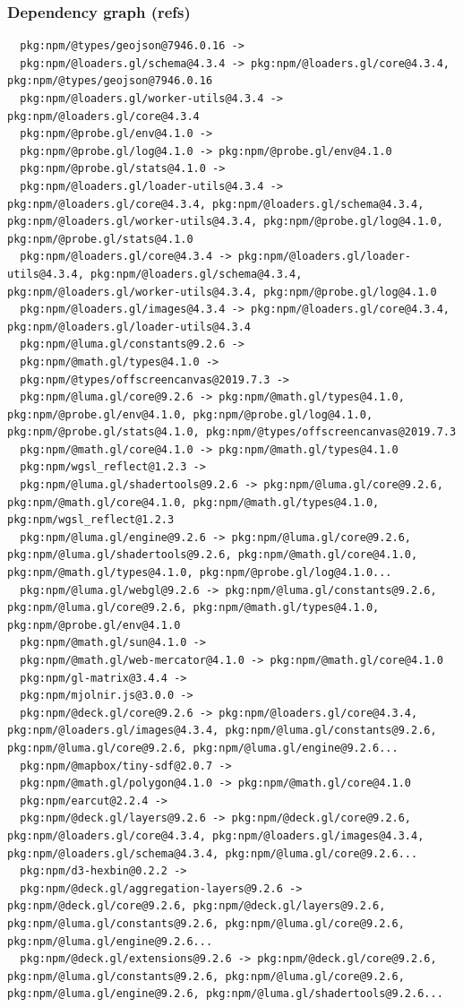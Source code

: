 \documentclass[11pt]{article}
\begin{document}
\subsubsection*{Dependency graph (refs)}
\begin{verbatim}
  pkg:npm/@types/geojson@7946.0.16 -> 
  pkg:npm/@loaders.gl/schema@4.3.4 -> pkg:npm/@loaders.gl/core@4.3.4, pkg:npm/@types/geojson@7946.0.16
  pkg:npm/@loaders.gl/worker-utils@4.3.4 -> pkg:npm/@loaders.gl/core@4.3.4
  pkg:npm/@probe.gl/env@4.1.0 -> 
  pkg:npm/@probe.gl/log@4.1.0 -> pkg:npm/@probe.gl/env@4.1.0
  pkg:npm/@probe.gl/stats@4.1.0 -> 
  pkg:npm/@loaders.gl/loader-utils@4.3.4 -> pkg:npm/@loaders.gl/core@4.3.4, pkg:npm/@loaders.gl/schema@4.3.4, pkg:npm/@loaders.gl/worker-utils@4.3.4, pkg:npm/@probe.gl/log@4.1.0, pkg:npm/@probe.gl/stats@4.1.0
  pkg:npm/@loaders.gl/core@4.3.4 -> pkg:npm/@loaders.gl/loader-utils@4.3.4, pkg:npm/@loaders.gl/schema@4.3.4, pkg:npm/@loaders.gl/worker-utils@4.3.4, pkg:npm/@probe.gl/log@4.1.0
  pkg:npm/@loaders.gl/images@4.3.4 -> pkg:npm/@loaders.gl/core@4.3.4, pkg:npm/@loaders.gl/loader-utils@4.3.4
  pkg:npm/@luma.gl/constants@9.2.6 -> 
  pkg:npm/@math.gl/types@4.1.0 -> 
  pkg:npm/@types/offscreencanvas@2019.7.3 -> 
  pkg:npm/@luma.gl/core@9.2.6 -> pkg:npm/@math.gl/types@4.1.0, pkg:npm/@probe.gl/env@4.1.0, pkg:npm/@probe.gl/log@4.1.0, pkg:npm/@probe.gl/stats@4.1.0, pkg:npm/@types/offscreencanvas@2019.7.3
  pkg:npm/@math.gl/core@4.1.0 -> pkg:npm/@math.gl/types@4.1.0
  pkg:npm/wgsl_reflect@1.2.3 -> 
  pkg:npm/@luma.gl/shadertools@9.2.6 -> pkg:npm/@luma.gl/core@9.2.6, pkg:npm/@math.gl/core@4.1.0, pkg:npm/@math.gl/types@4.1.0, pkg:npm/wgsl_reflect@1.2.3
  pkg:npm/@luma.gl/engine@9.2.6 -> pkg:npm/@luma.gl/core@9.2.6, pkg:npm/@luma.gl/shadertools@9.2.6, pkg:npm/@math.gl/core@4.1.0, pkg:npm/@math.gl/types@4.1.0, pkg:npm/@probe.gl/log@4.1.0...
  pkg:npm/@luma.gl/webgl@9.2.6 -> pkg:npm/@luma.gl/constants@9.2.6, pkg:npm/@luma.gl/core@9.2.6, pkg:npm/@math.gl/types@4.1.0, pkg:npm/@probe.gl/env@4.1.0
  pkg:npm/@math.gl/sun@4.1.0 -> 
  pkg:npm/@math.gl/web-mercator@4.1.0 -> pkg:npm/@math.gl/core@4.1.0
  pkg:npm/gl-matrix@3.4.4 -> 
  pkg:npm/mjolnir.js@3.0.0 -> 
  pkg:npm/@deck.gl/core@9.2.6 -> pkg:npm/@loaders.gl/core@4.3.4, pkg:npm/@loaders.gl/images@4.3.4, pkg:npm/@luma.gl/constants@9.2.6, pkg:npm/@luma.gl/core@9.2.6, pkg:npm/@luma.gl/engine@9.2.6...
  pkg:npm/@mapbox/tiny-sdf@2.0.7 -> 
  pkg:npm/@math.gl/polygon@4.1.0 -> pkg:npm/@math.gl/core@4.1.0
  pkg:npm/earcut@2.2.4 -> 
  pkg:npm/@deck.gl/layers@9.2.6 -> pkg:npm/@deck.gl/core@9.2.6, pkg:npm/@loaders.gl/core@4.3.4, pkg:npm/@loaders.gl/images@4.3.4, pkg:npm/@loaders.gl/schema@4.3.4, pkg:npm/@luma.gl/core@9.2.6...
  pkg:npm/d3-hexbin@0.2.2 -> 
  pkg:npm/@deck.gl/aggregation-layers@9.2.6 -> pkg:npm/@deck.gl/core@9.2.6, pkg:npm/@deck.gl/layers@9.2.6, pkg:npm/@luma.gl/constants@9.2.6, pkg:npm/@luma.gl/core@9.2.6, pkg:npm/@luma.gl/engine@9.2.6...
  pkg:npm/@deck.gl/extensions@9.2.6 -> pkg:npm/@deck.gl/core@9.2.6, pkg:npm/@luma.gl/constants@9.2.6, pkg:npm/@luma.gl/core@9.2.6, pkg:npm/@luma.gl/engine@9.2.6, pkg:npm/@luma.gl/shadertools@9.2.6...
\end{verbatim}
\end{document}
